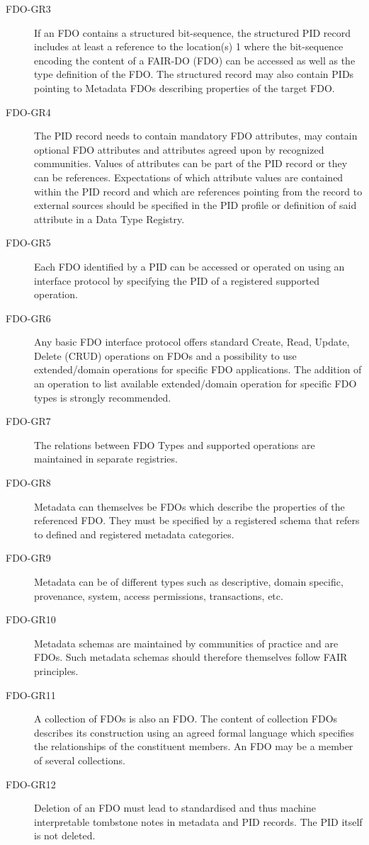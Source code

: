 \begin{description}
\item[FDO-GR3] If an FDO contains a structured bit-sequence, the structured PID record includes at least a reference to the location(s) 1 where the bit-sequence encoding the content of a FAIR-DO (FDO) can be accessed as well as the type definition of the FDO.  The structured record may also contain PIDs pointing to Metadata FDOs describing properties of the target FDO. 
\item[FDO-GR4] The PID record needs to contain mandatory FDO attributes, may contain optional FDO attributes and attributes agreed upon by recognized communities.  Values of attributes can be part of the PID record or they can be references.  Expectations of which attribute values are contained within the PID record and which are references pointing from the record to external sources should be specified in the PID profile or definition of said attribute in a Data Type Registry. 
\item[FDO-GR5] Each FDO identified by a PID can be accessed or operated on using an interface protocol by specifying the PID of a registered supported operation. 
\item[FDO-GR6] Any basic FDO interface protocol offers standard Create, Read, Update, Delete (CRUD) operations on FDOs and a possibility to use extended/domain operations for specific FDO applications.  The addition of an operation to list available extended/domain operation for specific FDO types is strongly recommended. 
\item[FDO-GR7] The relations between FDO Types and supported operations are maintained in separate registries. 
\item[FDO-GR8] Metadata can themselves be FDOs which describe the properties of the referenced FDO.  They must be specified by a registered schema that refers to defined and registered metadata categories. 
\item[FDO-GR9] Metadata can be of different types such as descriptive, domain specific, provenance, system, access permissions, transactions, etc. 
\item[FDO-GR10] Metadata schemas are maintained by communities of practice and are FDOs.  Such metadata schemas should therefore themselves follow FAIR principles. 
\item[FDO-GR11] A collection of FDOs is also an FDO.  The content of collection FDOs describes its construction using an agreed formal language which specifies the relationships of the constituent members.  An FDO may be a member of several collections. 
\item[FDO-GR12] Deletion of an FDO must lead to standardised and thus machine interpretable tombstone notes in metadata and PID records.  The PID itself is not deleted.

\end{description}
